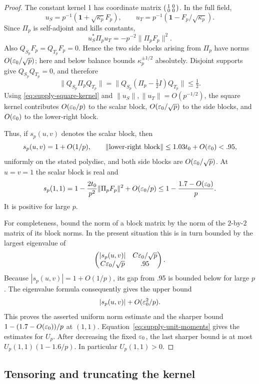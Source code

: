 \begin{proof}
The constant kernel 1 has coordinate matrix
\(\begin{psmallmatrix}1&0\\0&0\end{psmallmatrix}\).
In the full field,
\[
 u_S=p^{-1}(\mathbf1+\sqrt{\kappa_p}F_p),\qquad
 u_T=p^{-1}(\mathbf1-F_p/\sqrt{\kappa_p}).
\]
Since \(\Pi_p\) is self-adjoint and kills constants,
\[
 u_S^*\Pi_pu_T=-p^{-2}\|\Pi_pF_p\|^2.
\]
Also \(Q_{S_p}F_p=Q_{T_p}F_p=0\). Hence the two side blocks
arising from \(\Pi_p\) have norms \(O(\varepsilon_0/\sqrt p)\);
here and below balance bounds \(\kappa_p^{\pm1/2}\) absolutely.
Disjoint supports give \(Q_{S_p}Q_{T_p}=0\), and therefore
\[
 \|Q_{S_p}\Pi_pQ_{T_p}\|
 =\|Q_{S_p}(\Pi_p-\tfrac12 I)Q_{T_p}\|\le\tfrac12.
\]
Using \eqref{eq:supply-square-kernel} and
\(\|u_S\|,\|u_T\|=O(p^{-1/2})\), the square kernel contributes
\(O(\varepsilon_0/p)\) to the scalar block,
\(O(\varepsilon_0/\sqrt p)\) to the side blocks, and \(O(\varepsilon_0)\)
to the lower-right block.

Thus, if \(s_p(u,v)\) denotes the scalar block, then
\[
 s_p(u,v)=1+O(1/p),\qquad
 \|\text{lower-right block}\|\le1.03t_0+O(\varepsilon_0)<.95,
\]
uniformly on the stated polydisc, and both side blocks are
\(O(\varepsilon_0/\sqrt p)\).
At \(u=v=1\) the scalar block is real and
\[
 s_p(1,1)
 =1-\frac{2t_0}{p^2}\|\Pi_pF_p\|^2+O(\varepsilon_0/p)
 \le1-\frac{1.7-O(\varepsilon_0)}p.
\]
It is positive for large \(p\).

For completeness, bound the norm of a block matrix by the norm of
the \(2\)-by-\(2\) matrix of its block norms. In the present situation
this is in turn bounded by the largest eigenvalue of
\[
 \begin{pmatrix}
 |s_p(u,v)|&C\varepsilon_0/\sqrt p\\
 C\varepsilon_0/\sqrt p&.95
 \end{pmatrix}.
\]
Because \(|s_p(u,v)|=1+O(1/p)\), its gap from .95 is bounded
below for large \(p\). The eigenvalue formula consequently gives
the upper bound
\[
 |s_p(u,v)|+O(\varepsilon_0^2/p).
\]
This proves the asserted uniform norm estimate and the sharper
bound \(1-(1.7-O(\varepsilon_0))/p\) at \((1,1)\).
Equation~\eqref{eq:supply-unit-moments} gives the estimates for \(U_p\).
After decreasing the fixed \(\varepsilon_0\), the last sharper bound is at
most \(U_p(1,1)(1-1.6/p)\). In particular \(U_p(1,1)>0\).
\end{proof}

\subsection{Tensoring and truncating the kernel}

